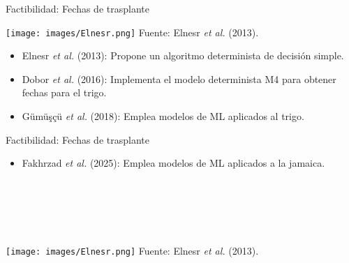 \documentclass[aspectratio=169]{beamer}
\begin{document}
\begin{frame}{Factibilidad: Fechas de trasplante}
	\begin{minipage}{0.5\textwidth}
		\hspace{-0.5cm}
		\centering
		\texttt{[image: images/Elnesr.png]}
		{\scriptsize Fuente: Elnesr \textit{et al.} (2013).}
	\end{minipage}%
	\begin{minipage}{0.5\textwidth}
		\begin{block}{}
			\begin{itemize}
				\item Elnesr \textit{et al.} (2013): Propone un algoritmo determinista de decisión simple.
				\item Dobor \textit{et al.} (2016): Implementa el modelo determinista M4 para obtener fechas para el trigo.
				\item Gümüşçü \textit{et al.} (2018): Emplea modelos de ML aplicados al trigo.
			\end{itemize}
		\end{block}
	\end{minipage}
\end{frame}

\begin{frame}{Factibilidad: Fechas de trasplante}
	\begin{minipage}{0.5\textwidth}
		\begin{block}{}
			\begin{itemize}
				\item Fakhrzad \textit{et al.} (2025): Emplea modelos de ML aplicados a la jamaica.
			\end{itemize}
			\phantom{.}\\
			\phantom{.}\\
			\phantom{.}\\
			\phantom{.}\\
		\end{block}
	\end{minipage}%
	\begin{minipage}{0.5\textwidth}
		\hspace{0cm}
		\centering
		\texttt{[image: images/Elnesr.png]}
		{\scriptsize Fuente: Elnesr \textit{et al.} (2013).}
	\end{minipage}%
\end{frame}
\end{document}
